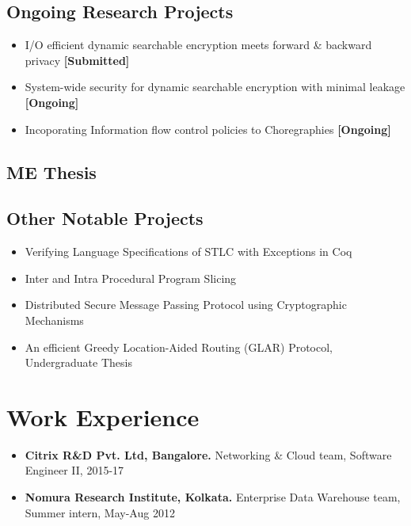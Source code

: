 \documentclass[9pt,a4paper]{moderncv}
\begin{document}
\subsection{Ongoing Research Projects}
\begin{itemize}
\item I/O efficient dynamic searchable encryption meets forward \& backward privacy \textbf{\textsf{[Submitted]}}
\item System-wide security for dynamic searchable encryption with minimal leakage \textsf{\textbf{[Ongoing]}}
\item Incoporating Information flow control policies to Choregraphies \textsf{\textbf{[Ongoing]}}
\end{itemize}
\subsection{ME Thesis}
\subsection{Other Notable Projects}
\begin{itemize}
\item Verifying Language Specifications of STLC with Exceptions in Coq %
\item Inter and Intra Procedural Program Slicing%
\item Distributed Secure Message Passing Protocol using Cryptographic Mechanisms%
\item An efficient Greedy Location-Aided Routing (GLAR) Protocol, Undergraduate Thesis
\end{itemize}
\section{Work Experience}
\begin{itemize}
\item \textbf{Citrix R\&D Pvt. Ltd, Bangalore.} Networking \& Cloud team, Software Engineer II, 2015-17
\item \textbf{Nomura Research Institute, Kolkata.} Enterprise Data Warehouse team, Summer intern, May-Aug 2012
\end{itemize}
\end{document}
